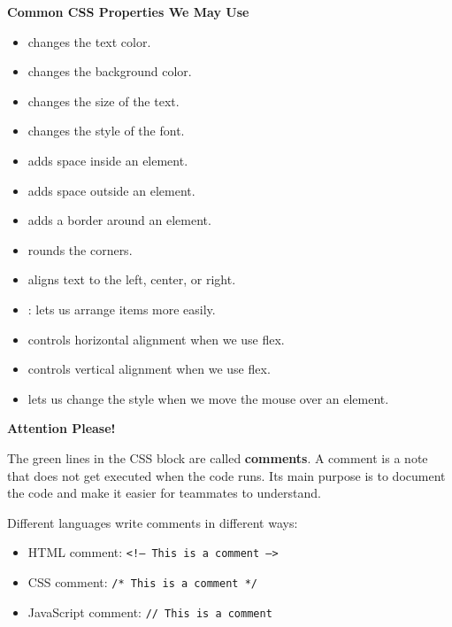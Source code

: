 \documentclass{article}
\begin{document}
\vspace{0.4cm}

\textbf{\Bitter\textcolor{naranja}{Common CSS Properties We May Use}}

\vspace{0.1cm}

\begin{itemize}[leftmargin=1.2cm, itemsep=4pt]
  \item {} changes the text color.
  \item {} changes the background color.
  \item {} changes the size of the text.
  \item {} changes the style of the font.
  \item {} adds space inside an element.
  \item {} adds space outside an element.
  \item {} adds a border around an element.
  \item {} rounds the corners.
  \item {} aligns text to the left, center, or right.
  \item {}:  lets us arrange items more easily.
  \item {} controls horizontal alignment when we use flex.
  \item {} controls vertical alignment when we use flex.
  \item {} lets us change the style when we move the mouse over an element.
\end{itemize}

\vspace{0.4cm}

\begin{attentionbox}
  \textbf{\Bitter\textcolor{naranja}{Attention Please!}}

  The green lines in the CSS block are called \textbf{comments}. A comment is a note that does not get executed when the code runs. Its main purpose is to document the code and make it easier for teammates to understand.

  \vspace{0.15cm}

  Different languages write comments in different ways:

  \begin{itemize}[leftmargin=1.2cm, itemsep=4pt]
    \item HTML comment: \texttt{\textcolor{csscommentgreen}{<!-- This is a comment -->}}
    \item CSS comment: \texttt{\textcolor{csscommentgreen}{/* This is a comment */}}
    \item JavaScript comment: \texttt{\textcolor{csscommentgreen}{// This is a comment}}
  \end{itemize}

\end{attentionbox}
\end{document}
